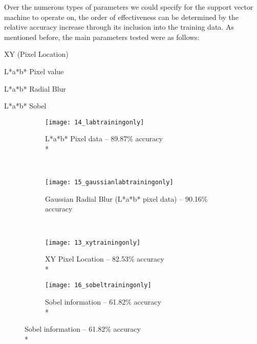 Over the numerous types of parameters we could specify for the support vector machine to operate on, the order of effectiveness can be determined by the relative accuracy increase through its inclusion into the training data.
As mentioned before, the main parameters tested were as follows:
\begin{description}
  \item XY (Pixel Location)
  \item L*a*b* Pixel value
  \item L*a*b* Radial Blur
  \item L*a*b* Sobel
\end{description}
\begin{figure}
        \centering
        \begin{subfigure}[b]{0.3\textwidth}
                \centering
                \texttt{[image: 14\_labtrainingonly]}
                \caption{L*a*b* Pixel data -- 89.87\% accuracy \\*}
                \label{fig:14_labtrainingonly}
        \end{subfigure}%
        ~ %
        \begin{subfigure}[b]{0.3\textwidth}
                \centering
                \texttt{[image: 15\_gaussianlabtrainingonly]}
                \caption{Gaussian Radial Blur (L*a*b* pixel data) -- 90.16\% accuracy}
                \label{fig:15_gaussianlabtrainingonly}     
        \end{subfigure}
        ~ %
        \begin{subfigure}[b]{0.3\textwidth}
                \centering
                \texttt{[image: 13\_xytrainingonly]}
                \caption{XY Pixel Location -- 82.53\% accuracy \\*}
                \label{fig:13_xytrainingonly}
        \end{subfigure}
         \begin{subfigure}[b]{0.3\textwidth}
                \centering
                \texttt{[image: 16\_sobeltrainingonly]}
                \caption{Sobel information -- 61.82\% accuracy \\*}
                \label{fig:16_sobeltrainingonly}
        \end{subfigure}

\end{figure}
